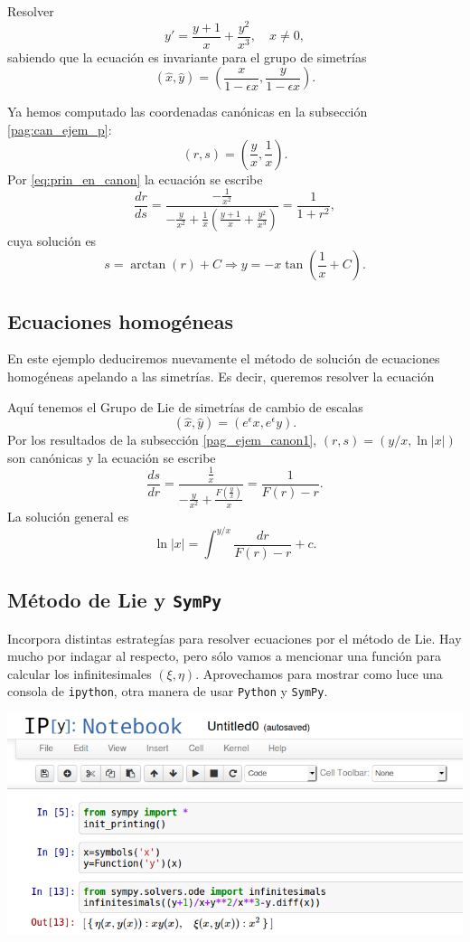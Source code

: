 \begin{ejemplo} Resolver
\[y'=\frac{y+1}{x}+\frac{y^2}{x^3},\quad x\neq 0,\]
sabiendo que la ecuación es invariante para el grupo de simetrías
\[(\hat{x},\hat{y})=\left(\frac{x}{1-\epsilon x},\frac{y}{1-\epsilon x}   \right).\]
\end{ejemplo}
Ya hemos computado las coordenadas canónicas en la subsección \ref{pag:can_ejem_p}:
\[(r,s)=\left(\frac{y}{x},\frac{1}{x}\right).\]
Por \eqref{eq:prin_en_canon} la ecuación se escribe
\[\frac{dr}{ds}=\frac{-\frac{1}{x^2} }{-\frac{y}{x^2}+\frac{1}{x}\left(
\frac{y+1}{x}+\frac{y^2}{x^3}\right)}=\frac{1}{1+r^2},\]
cuya solución es
\[s=\arctan(r)+C\Rightarrow y=-x\tan\left(\frac{1}{x}+C\right).\]



\subsection{Ecuaciones homogéneas}
\begin{ejemplo} En este ejemplo deduciremos nuevamente el método de solución de ecuaciones homogéneas apelando a las simetrías. Es decir, queremos resolver la ecuación
\end{ejemplo}
Aquí tenemos el Grupo de Lie de simetrías de cambio de escalas
\[(\hat{x},\hat{y})=(e^{\epsilon}x,e^{\epsilon}y).\] 
Por los resultados de la subsección \ref{pag_ejem_canon1}, $(r,s)=(y/x,\ln|x|)$ son canónicas y la ecuación se escribe
\[\frac{ds}{dr}=\frac{\frac{1}{x}}{-\frac{y}{x^2}+\frac{F\left(\frac{y}{x}\right)}{x}}=\frac{1}{F(r)-r}.\]
La solución general es 
\[\ln|x|=\int^{y/x}\frac{dr}{F(r)-r}+c.\]




\subsection{Método de Lie y \texttt{SymPy}}
 Incorpora distintas estrategías para resolver ecuaciones por el método de Lie. Hay mucho por indagar al respecto, pero sólo vamos a mencionar una función para calcular los infinitesimales $(\xi,\eta)$.  Aprovechamos para mostrar como luce una consola de \texttt{ipython}, otra manera de usar \texttt{Python} y \texttt{SymPy}.

\includegraphics[scale=.45]{imagenes/ipython.png}


